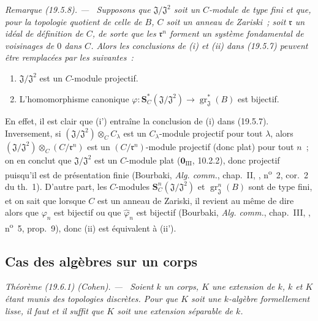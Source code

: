 \documentclass[10pt,oneside]{book}
\makeatletter
\newcommand{\gr}{\operatorname{gr}}
\newcommand{\setmanualcurrentlabel}[1]{\def\@currentlabel{#1}}
\newenvironment{theorem}[1][]{%
  \setmanualcurrentlabel{#1}\par\medskip\noindent\itshape Théorème (#1). ---\ }{\par}
\newenvironment{remark}[1][]{%
  \setmanualcurrentlabel{#1}\par\medskip\noindent\itshape Remarque (#1). ---\ }{\par}
\makeatother
\begin{document}
\begin{remark}[19.5.8]
\label{0.19.5.8-fr}
Supposons que $\mathfrak J/\mathfrak J^2$ soit un $C$-module de type fini et
que, pour la topologie quotient de celle de $B$, $C$ soit un anneau de Zariski~;
soit $\mathfrak r$ un idéal de définition de $C$, de sorte que les
$\mathfrak r^n$ forment un système fondamental de voisinages de $0$ dans $C$.
Alors les conclusions de (i) et (ii) dans (19.5.7) peuvent être remplacées par
les suivantes~:
\begin{enumerate}
  \item[\rm(i')] $\mathfrak J/\mathfrak J^2$ est un $C$-module projectif.
  \item[\rm(ii')] L'homomorphisme canonique
  $\varphi:\mathbf S_C^*(\mathfrak J/\mathfrak J^2)
  \to\gr_{\mathfrak J}^*(B)$ est bijectif.
\end{enumerate}
En effet, il est clair que (i') entraîne la conclusion de (i) dans (19.5.7).
Inversement, si $(\mathfrak J/\mathfrak J^2)\otimes_C C_\lambda$ est un
$C_\lambda$-module projectif pour tout $\lambda$, alors
$(\mathfrak J/\mathfrak J^2)\otimes_C(C/\mathfrak r^n)$ est un
$(C/\mathfrak r^n)$-module projectif (donc plat) pour tout $n$~; on en conclut
que $\mathfrak J/\mathfrak J^2$ est un $C$-module plat
($\mathbf 0_{\mathrm{III}}$, 10.2.2), donc projectif puisqu'il est de
présentation finie (Bourbaki, \emph{Alg. comm.}, chap.~II, ,
n\textsuperscript{o}~2, cor.~2 du th.~1). D'autre part, les $C$-modules
$\mathbf S_C^n(\mathfrak J/\mathfrak J^2)$ et $\gr_{\mathfrak J}^n(B)$ sont
de type fini, et on sait que lorsque $C$ est un anneau de Zariski, il revient
au même de dire alors que $\varphi_n$ est bijectif ou que
$\widehat\varphi_n$ est bijectif (Bourbaki, \emph{Alg. comm.}, chap.~III,
, n\textsuperscript{o}~5, prop.~9), donc (ii) est équivalent à
(ii').
\end{remark}

\subsection{Cas des algèbres sur un corps}
\label{subsection:0.19.6-fr}

\begin{theorem}[19.6.1) (Cohen]
\label{0.19.6.1-fr}
Soient $k$ un corps, $K$ une extension de $k$, $k$ et $K$
étant munis des topologies discrètes. Pour que $K$ soit une $k$-algèbre
formellement lisse, il faut et il suffit que $K$ soit une extension séparable
de $k$.
\end{theorem}
\end{document}
